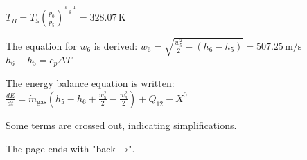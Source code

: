 \( T_B = T_5 \left( \frac{p_0}{p_5} \right)^{\frac{k-1}{k}} = 328.07 \, \text{K} \)  

The equation for \( w_6 \) is derived:  
\( w_6 = \sqrt{\frac{w_5^2}{2} - (h_6 - h_5)} = 507.25 \, \text{m/s} \)  
\( h_6 - h_5 = c_p \Delta T \)  

The energy balance equation is written:  
\( \frac{dE}{dt} = \dot{m}_{\text{gas}} (h_5 - h_6 + \frac{w_5^2}{2} - \frac{w_6^2}{2}) + Q_{12} - X^0 \)  

Some terms are crossed out, indicating simplifications.  

The page ends with "back →".